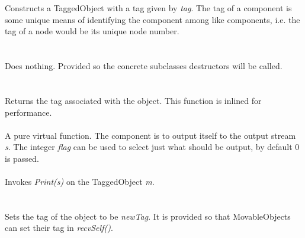   \\
  \\
Constructs a TaggedObject with a tag given by {\em tag}. The tag of
a component is some unique means of identifying the component among
like components, i.e. the tag of a node would be its unique node number. \\

  \\
\\
Does nothing. Provided so the concrete subclasses destructors will be
called. \\

  \\
 \\
Returns the tag associated with the object. This function is inlined
for performance.\\

 \\
A pure virtual function. The component is to output itself to the output
stream {\em s}. The integer {\em flag} can be used to select just what
should be output, by default $0$ is passed. \\

 \\  
Invokes {\em Print(s)} on the TaggedObject {\em m}. \\

  \\
 \\
Sets the tag of the object to be {\em newTag}. It is provided so that
MovableObjects can set their tag in {\em recvSelf()}.








